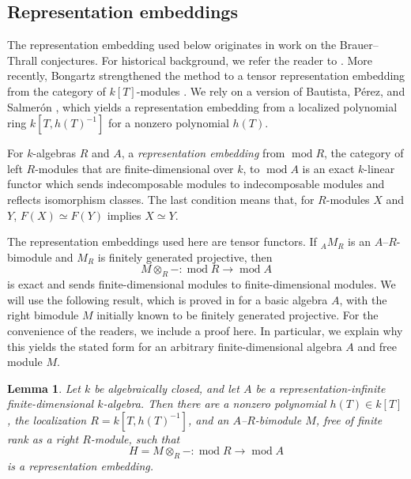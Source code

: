 \documentclass[11pt,letterpaper,reqno]{amsart}
\newtheorem{lemma}[lemma]{Lemma}
\theoremstyle{definition}
\newcommand{\modcat}{\operatorname{mod}}
\begin{document}
\subsection{Representation embeddings}\label{subsec:representation-embeddings}
The representation embedding used below originates in work on the Brauer--Thrall conjectures. For historical background, we refer the reader to \cite{Roiter, Ringel,Bautista85,Bongartz85}. More recently, Bongartz strengthened the method to a tensor
representation embedding from the category of $k[T]$-modules
\cite[Theorem~6 (i)]{Bongartz}.
We rely on a version of Bautista, P\'erez, and Salmer\'on \cite{BPS},
which yields a representation embedding from a localized polynomial ring
$k[T,h(T)^{-1}]$ for a nonzero polynomial $h(T)$.  

For $k$-algebras $R$ and $A$,
a \emph{representation embedding} from $\modcat R$, the category of left $R$-modules that are finite-dimensional over $k$, to $\modcat A$ is an
exact $k$-linear functor which sends indecomposable modules to
indecomposable modules and reflects isomorphism classes.  The last condition means that, for $R$-modules $X$ and $Y$,
$F(X)\simeq F(Y)$ implies $X\simeq Y$.

The representation embeddings used here are tensor functors.  If
${}_AM_R$ is an $A$--$R$-bimodule and $M_R$ is finitely generated
projective, then
\[
M\otimes_R-:\modcat R\longrightarrow\modcat A
\]
is exact and sends finite-dimensional modules to finite-dimensional
modules.  
We will use the following result, which is proved in \cite{BPS} for a basic algebra $A$, with the right bimodule $M$ initially known to be finitely generated projective. For the convenience of the readers, we include a proof here. In particular, we explain why this yields the stated form for an arbitrary finite-dimensional algebra $A$ and free module $M$.

\begin{lemma}\label{lem:polynomial-embedding}
Let $k$ be algebraically closed, and let $A$ be a representation-infinite
finite-dimensional $k$-algebra.  Then there are a nonzero polynomial
$h(T)\in k[T]$, the localization $R=k[T,h(T)^{-1}]$, and an $A$--$R$-bimodule $M$, free of finite rank as a right $R$-module,
such that
\[
H=M\otimes_R-:\modcat R\longrightarrow\modcat A
\]
is a representation embedding.
\end{lemma}
\end{document}
